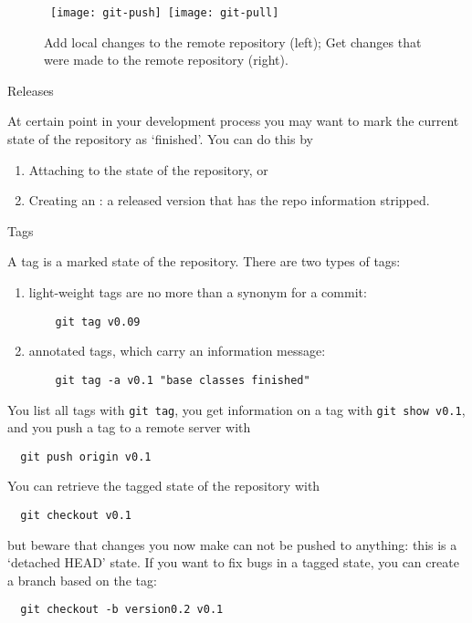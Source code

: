 \begin{figure}[ht]
  \hbox{
  \texttt{[image: git-push]}
  \texttt{[image: git-pull]}
  }
  \caption{Add local changes to the remote repository (left);
    Get changes that were made to the remote repository (right).}
  \label{fig:git-push}
  \label{fig:git-pull}
\end{figure}

 {Releases}

At certain point in your development process you
may want to mark the current state of the repository
as `finished'.
You can do this by 
\begin{enumerate}
\item Attaching  to the state of the repository, or
\item Creating an : a released version that
  has the repo information stripped.
\end{enumerate}

 {Tags}

A tag is a marked state of the repository.
There are two types of tags:
\begin{enumerate}
\item light-weight tags are no more than a synonym for a commit:
  \begin{lstlisting}
    git tag v0.09
  \end{lstlisting}
\item annotated tags, which carry an information message:
  \begin{lstlisting}
    git tag -a v0.1 "base classes finished"
  \end{lstlisting}
\end{enumerate}

You list all tags with \lstinline{git tag},
you get information on a tag with \lstinline{git show v0.1},
and you push a tag to a remote server with
\begin{lstlisting}
  git push origin v0.1
\end{lstlisting}

You can retrieve the tagged state of the repository with
\begin{lstlisting}
  git checkout v0.1
\end{lstlisting}
but beware that changes you now make can not be pushed to anything:
this is a `detached HEAD' state.
If you want to fix bugs in a tagged state,
you can create a branch based on the tag:
\begin{lstlisting}
  git checkout -b version0.2 v0.1
\end{lstlisting}

